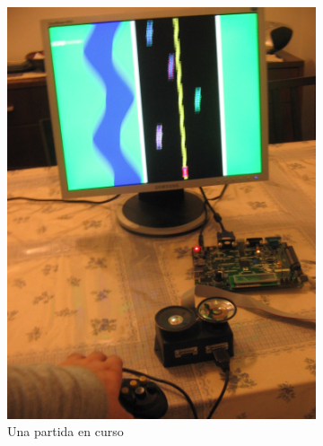\documentclass[10pt, a4paper,english,spanish]{article}
\begin{document}
\begin{figure}[!h]
\centering
\begin{subfigure}{.5\textwidth}
	\centering
	\includegraphics[width=\linewidth,angle=-90]{fotos/IMG_0203.JPG}
	\caption{Una partida en curso}
	\label{fig:current}
\end{subfigure}%
\begin{subfigure}{.5\textwidth}
	\centering

\end{subfigure}
\end{figure}
\end{document}
